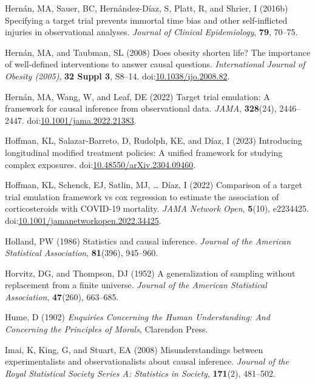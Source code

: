 \documentclass[
  singlecolumn]{article}
\newlength{\cslhangindent}
\newenvironment{CSLReferences}[2] %
 {\begin{list}{}{%
  \setlength{\itemindent}{0pt}
  \setlength{\leftmargin}{0pt}
  \setlength{\parsep}{0pt}
  \ifodd #1
   \setlength{\leftmargin}{\cslhangindent}
   \setlength{\itemindent}{-1\cslhangindent}
  \fi
  \setlength{\itemsep}{#2\baselineskip}}}
 {\end{list}}
\begin{document}
\begin{CSLReferences}{1}{0}
Hernán, MA, Sauer, BC, Hernández-Díaz, S, Platt, R, and Shrier, I
(2016b) Specifying a target trial prevents immortal time bias and other
self-inflicted injuries in observational analyses. \emph{Journal of
Clinical Epidemiology}, \textbf{79}, 70--75.

Hernán, MA, and Taubman, SL (2008) Does obesity shorten life? The
importance of well-defined interventions to answer causal questions.
\emph{International Journal of Obesity (2005)}, \textbf{32 Suppl 3},
S8--14.
doi:\href{https://doi.org/10.1038/ijo.2008.82}{10.1038/ijo.2008.82}.

Hernán, MA, Wang, W, and Leaf, DE (2022) Target trial emulation: A
framework for causal inference from observational data. \emph{JAMA},
\textbf{328}(24), 2446--2447.
doi:\href{https://doi.org/10.1001/jama.2022.21383}{10.1001/jama.2022.21383}.

Hoffman, KL, Salazar-Barreto, D, Rudolph, KE, and Díaz, I (2023)
Introducing longitudinal modified treatment policies: A unified
framework for studying complex exposures.
doi:\href{https://doi.org/10.48550/arXiv.2304.09460}{10.48550/arXiv.2304.09460}.

Hoffman, KL, Schenck, EJ, Satlin, MJ, \ldots{} Díaz, I (2022) Comparison
of a target trial emulation framework vs cox regression to estimate the
association of corticosteroids with COVID-19 mortality. \emph{JAMA
Network Open}, \textbf{5}(10), e2234425.
doi:\href{https://doi.org/10.1001/jamanetworkopen.2022.34425}{10.1001/jamanetworkopen.2022.34425}.

Holland, PW (1986) Statistics and causal inference. \emph{Journal of the
American Statistical Association}, \textbf{81}(396), 945--960.

Horvitz, DG, and Thompson, DJ (1952) A generalization of sampling
without replacement from a finite universe. \emph{Journal of the
American Statistical Association}, \textbf{47}(260), 663--685.

Hume, D (1902) \emph{Enquiries Concerning the Human Understanding: And
Concerning the Principles of Morals}, Clarendon Press.

Imai, K, King, G, and Stuart, EA (2008) Misunderstandings between
experimentalists and observationalists about causal inference.
\emph{Journal of the Royal Statistical Society Series A: Statistics in
Society}, \textbf{171}(2), 481--502.


\end{CSLReferences}
\end{document}
